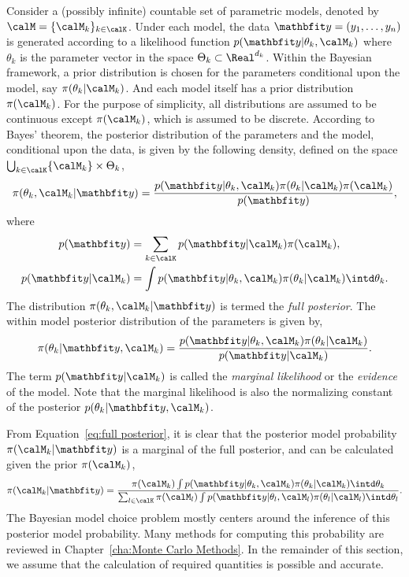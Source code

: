 Consider a (possibly infinite) countable set of parametric models, denoted by
$\calM = \{\calM_k\}_{k\in\calK}$. Under each model, the data $\data =
(y_1,\dots,y_n)$ is generated according to a likelihood function
$p(\data|\theta_k,\calM_k)$ where $\theta_k$ is the parameter vector in the
space $\Theta_k\subset\Real^{d_k}$. Within the Bayesian framework, a prior
distribution is chosen for the parameters conditional upon the model, say
$\pi(\theta_k|\calM_k)$. And each model itself has a prior distribution
$\pi(\calM_k)$. For the purpose of simplicity, all distributions are assumed
to be continuous except $\pi(\calM_k)$, which is assumed to be discrete.
According to Bayes' theorem, the posterior distribution of the parameters and
the model, conditional upon the data, is given by the following density,
defined on the space $\bigcup_{k\in\calK}\{\calM_k\}\times\Theta_k$,
\begin{equation}
  \pi(\theta_k,\calM_k|\data) =
  \frac{p(\data|\theta_k,\calM_k)\pi(\theta_k|\calM_k)\pi(\calM_k)}{p(\data)},
  \label{eq:full posterior}
\end{equation}
where
\begin{align}
  p(\data) &= \sum_{k\in\calK}p(\data|\calM_k)\pi(\calM_k), \\
  p(\data|\calM_k) &=
  \int p(\data|\theta_k,\calM_k)\pi(\theta_k|\calM_k)\intd\theta_k.
  \label{eq:marginal likelihood}
\end{align}
The distribution $\pi(\theta_k,\calM_k|\data)$ is termed the \emph{full
  posterior}. The within model posterior distribution of the parameters is
given by,
\begin{equation}
  \pi(\theta_k|\data,\calM_k) =
  \frac{p(\data|\theta_k,\calM_k)\pi(\theta_k|\calM_k)}{p(\data|\calM_k)}.
  \label{eq:within posterior}
\end{equation}
The term $p(\data|\calM_k)$ is called the \emph{marginal likelihood} or the
\emph{evidence} of the model. Note that the marginal likelihood is also the
normalizing constant of the posterior $p(\theta_k|\data,\calM_k)$.

From Equation~\eqref{eq:full posterior}, it is clear that the posterior model
probability $\pi(\calM_k|\data)$ is a marginal of the full posterior, and can
be calculated given the prior $\pi(\calM_k)$,
\begin{equation}
  \pi(\calM_k|\data) = \frac{
    \pi(\calM_k)
    \int p(\data|\theta_k,\calM_k)\pi(\theta_k|\calM_k)\intd\theta_k
  }{
    \sum_{l\in\calK}\pi(\calM_l)
    \int p(\data|\theta_l,\calM_l)\pi(\theta_l|\calM_l)\intd\theta_l
  }.
  \label{eq:post model prob}
\end{equation}
The Bayesian model choice problem mostly centers around the inference of this
posterior model probability. Many methods for computing this probability are
reviewed in Chapter~\ref{cha:Monte Carlo Methods}. In the remainder of this
section, we assume that the calculation of required quantities is possible and
accurate.

